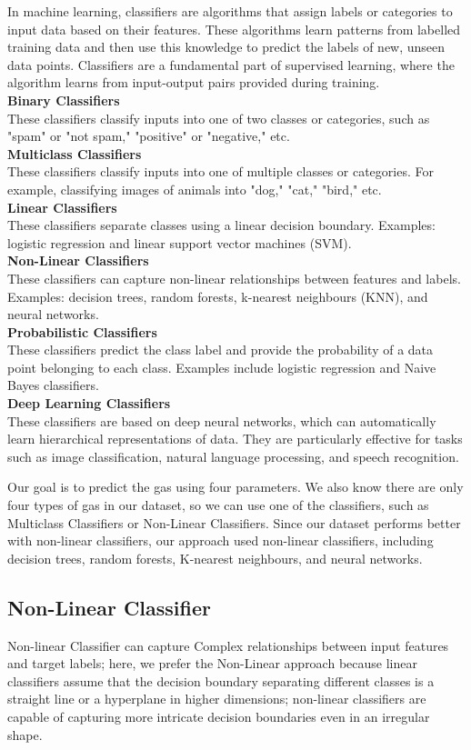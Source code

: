 In machine learning, classifiers are algorithms that assign labels or categories to input data based on their features. These algorithms learn patterns from labelled training data and then use this knowledge to predict the labels of new, unseen data points. Classifiers are a fundamental part of supervised learning, where the algorithm learns from input-output pairs provided during training.\\
\textbf{Binary Classifiers}\\
These classifiers classify inputs into one of two classes or categories, such as "spam" or "not spam," "positive" or "negative," etc.\\
\textbf{Multiclass Classifiers}\\
These classifiers classify inputs into one of multiple classes or categories. For example, classifying images of animals into "dog," "cat," "bird," etc.\\
\textbf{Linear Classifiers}\\
These classifiers separate classes using a linear decision boundary. Examples: logistic regression and linear support vector machines (SVM).\\
\textbf{Non-Linear Classifiers}\\
These classifiers can capture non-linear relationships between features and labels. Examples: decision trees, random forests, k-nearest neighbours (KNN), and neural networks.\\
\textbf{Probabilistic Classifiers}\\
These classifiers predict the class label and provide the probability of a data point belonging to each class. Examples include logistic regression and Naive Bayes classifiers.\\
\textbf{Deep Learning Classifiers}\\
These classifiers are based on deep neural networks, which can automatically learn hierarchical representations of data. They are particularly effective for tasks such as image classification, natural language processing, and speech recognition.

Our goal is to predict the gas using four parameters. We also know there are only four types of gas in our dataset, so we can use one of the classifiers, such as Multiclass Classifiers or Non-Linear Classifiers. Since our dataset performs better with non-linear classifiers, our approach used non-linear classifiers, including decision trees, random forests, K-nearest neighbours, and neural networks.

\subsection{Non-Linear Classifier}
Non-linear Classifier can capture Complex relationships between input features and target labels; here, we prefer the Non-Linear approach because linear classifiers assume that the decision boundary separating different classes is a straight line or a hyperplane in higher dimensions; non-linear classifiers are capable of capturing more intricate decision boundaries even in an irregular shape.

